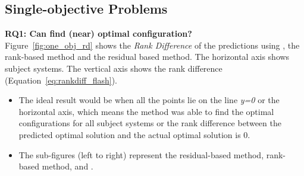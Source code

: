 \subsection{Single-objective Problems}\label{sec:so_results}
\noindent\textbf{RQ1: Can  \flash find (near) optimal configuration?}\\
Figure~\ref{fig:one_obj_rd} shows the \textit{Rank Difference} of the predictions using \flash, the rank-based method and the residual based method. 
The horizontal axis shows subject systems. The vertical axis shows the rank difference (Equation~\ref{eq:rankdiff_flash}).
\begin{itemize}[leftmargin=*]
    \item 
    The ideal result would be when all the points lie on the line \textit{y=0} or the horizontal axis, which means the method was able to find the optimal configurations for all subject systems or the rank difference between the predicted optimal solution and the actual optimal solution is 0. 
    \item The sub-figures (left to right) represent the residual-based method, rank-based method, and \flash.
\end{itemize}


